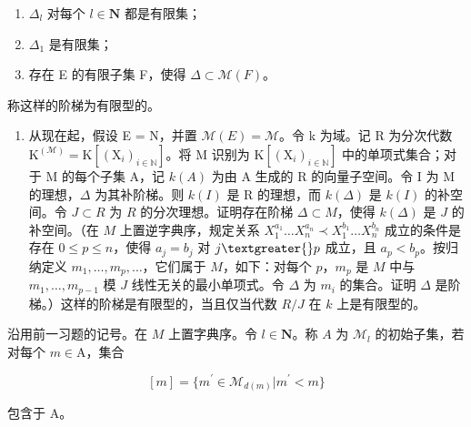\begin{enumerate}
\def\labelenumi{(\roman{enumi})}
\item
  \(\Delta_l\) 对每个 \(l \in \mathbf{N}\) 都是有限集；
\item
  \(\Delta_{1}\) 是有限集；
\item
  存在 E 的有限子集 F，使得 \(\Delta\subset\mathcal{M}(F)\)。
\end{enumerate}

称这样的阶梯为有限型的。

\begin{enumerate}
\def\labelenumi{\alph{enumi})}
\setcounter{enumi}{2}
\tightlist
\item
  从现在起，假设 E = N，并置 \(\mathcal{M}(E) = \mathcal{M}\)。令 k 为域。记 R 为分次代数 \(\mathrm{K}^{(\mathcal{M})} = \mathrm{K}[(\mathrm{X}_i)_{i \in \mathbb{N}}]\)。将 M 识别为 \(\mathrm{K}[(\mathrm{X}_i)_{i \in \mathbb{N}}]\) 中的单项式集合；对于 M 的每个子集 A，记 \(k(A)\) 为由 A 生成的 R 的向量子空间。令 I 为 M 的理想，\(\Delta\) 为其补阶梯。则 \(k(I)\) 是 R 的理想，而 \(k(\Delta)\) 是 \(k(I)\) 的补空间。令 \(J \subset R\) 为 \(R\) 的分次理想。证明存在阶梯 \(\Delta \subset M\)，使得 \(k(\Delta)\) 是 \(J\) 的补空间。（在 \(M\) 上置逆字典序，规定关系 \(X_1^{a_1} \ldots X_n^{a_n} \prec X_1^{b_1} \ldots X_n^{b_n}\) 成立的条件是存在 \(0 \leqslant p \leqslant n\)，使得 \(a_j = b_j\) 对 \(j \textgreater{} p\) 成立，且 \(a_p < b_p\)。按归纳定义 \(m_1, \ldots, m_p, \ldots\)，它们属于 \(M\)，如下：对每个 \(p\)，\(m_p\) 是 \(M\) 中与 \(m_1, \ldots, m_{p-1}\) 模 \(J\) 线性无关的最小单项式。令 \(\Delta\) 为 \(m_i\) 的集合。证明 \(\Delta\) 是阶梯。）这样的阶梯是有限型的，当且仅当代数 \(R/J\) 在 \(k\) 上是有限型的。
\end{enumerate}

  沿用前一习题的记号。在 \(M\) 上置字典序。令 \(l \in \mathbf{N}\)。称 \(A\) 为 \(\mathcal{M}_{l}\) 的初始子集，若对每个 \(m \in \mathrm{A}\)，集合

\[
[ m ] = \{m ^ {\prime} \in \mathcal {M} _ {d (m)} | m ^ {\prime} <   m \}
\]

包含于 A。

